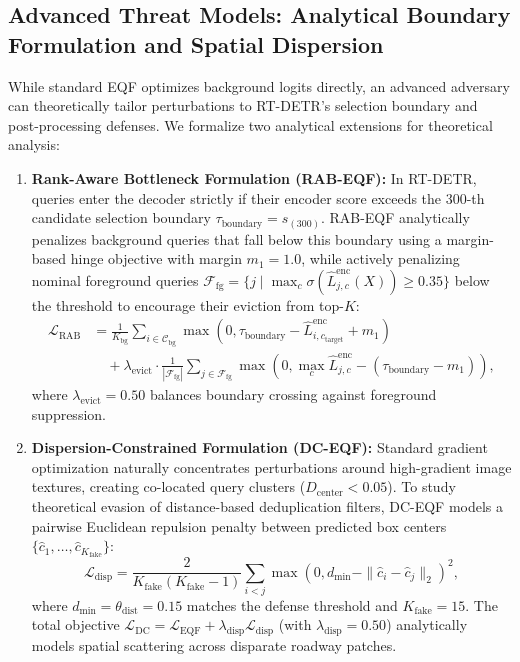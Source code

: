 \documentclass[preprint,12pt]{elsarticle}
\begin{document}
\subsection{Advanced Threat Models: Analytical Boundary Formulation and Spatial Dispersion}
\label{sec:rab_and_dc_formulation}
While standard EQF optimizes background logits directly, an advanced adversary can theoretically tailor perturbations to RT-DETR's selection boundary and post-processing defenses. We formalize two analytical extensions for theoretical analysis:
\begin{enumerate}
    \item \textbf{Rank-Aware Bottleneck Formulation (RAB-EQF):} In RT-DETR, queries enter the decoder strictly if their encoder score exceeds the 300-th candidate selection boundary $\tau_{\mathrm{boundary}} = s_{(300)}$. RAB-EQF analytically penalizes background queries that fall below this boundary using a margin-based hinge objective with margin $m_1 = 1.0$, while actively penalizing nominal foreground queries $\mathcal{F}_{\mathrm{fg}} = \{j \mid \max_c \sigma(\hat{L}_{j, c}^{\mathrm{enc}}(X)) \ge 0.35\}$ below the threshold to encourage their eviction from top-$K$:
    \begin{equation}
        \label{eq:rab_loss}
        \begin{aligned}
        \mathcal{L}_{\mathrm{RAB}} &= \frac{1}{K_{\mathrm{bg}}} \sum_{i \in \mathcal{C}_{\mathrm{bg}}} \max\left(0, \tau_{\mathrm{boundary}} - \hat{L}_{i, c_{\mathrm{target}}}^{\mathrm{enc}} + m_1\right) \\
        &\quad + \lambda_{\mathrm{evict}} \cdot \frac{1}{|\mathcal{F}_{\mathrm{fg}}|} \sum_{j \in \mathcal{F}_{\mathrm{fg}}} \max\left(0, \max_c \hat{L}_{j, c}^{\mathrm{enc}} - (\tau_{\mathrm{boundary}} - m_1)\right),
        \end{aligned}
    \end{equation}
    where $\lambda_{\mathrm{evict}} = 0.50$ balances boundary crossing against foreground suppression.
    \item \textbf{Dispersion-Constrained Formulation (DC-EQF):} Standard gradient optimization naturally concentrates perturbations around high-gradient image textures, creating co-located query clusters ($D_{\mathrm{center}} < 0.05$). To study theoretical evasion of distance-based deduplication filters, DC-EQF models a pairwise Euclidean repulsion penalty between predicted box centers $\{\hat{c}_1, \dots, \hat{c}_{K_{\mathrm{fake}}}\}$:
    \begin{equation}
        \label{eq:disp_loss}
        \mathcal{L}_{\mathrm{disp}} = \frac{2}{K_{\mathrm{fake}}(K_{\mathrm{fake}}-1)} \sum_{i < j} \max\left(0, d_{\mathrm{min}} - \|\hat{c}_i - \hat{c}_j\|_2 \right)^2,
    \end{equation}
    where $d_{\mathrm{min}} = \theta_{\mathrm{dist}} = 0.15$ matches the defense threshold and $K_{\mathrm{fake}} = 15$. The total objective $\mathcal{L}_{\mathrm{DC}} = \mathcal{L}_{\mathrm{EQF}} + \lambda_{\mathrm{disp}} \mathcal{L}_{\mathrm{disp}}$ (with $\lambda_{\mathrm{disp}} = 0.50$) analytically models spatial scattering across disparate roadway patches.
\end{enumerate}
\end{document}
